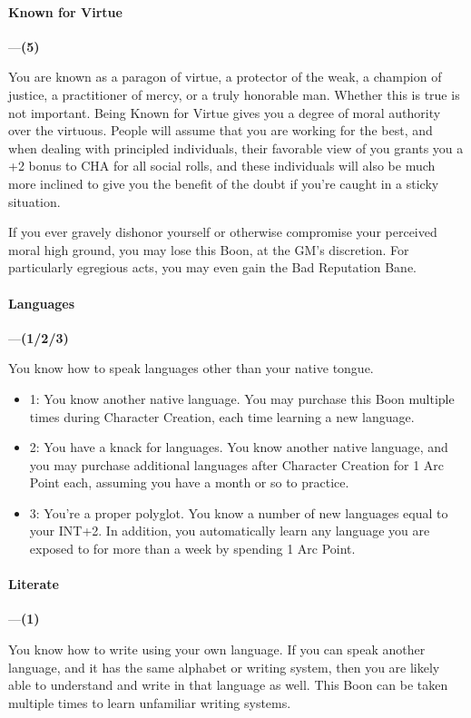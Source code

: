 \documentclass[oneside,11pt,english]{book}
\begin{document}
\paragraph{\label{boon:Known for Virtue}Known for Virtue}---\quad\textbf{(5)}\par
You are known as a paragon of virtue, a protector of the weak, a champion of justice, a practitioner of 
mercy, or a truly honorable man. Whether this is true is not important. Being Known for Virtue gives you 
a degree of moral authority over the virtuous. People will assume that you are working for the best, and 
when dealing with principled individuals, their favorable view of you grants you a +2 bonus to CHA for 
all social rolls, and these individuals will also be much more inclined to give you the benefit of the doubt 
if you're caught in a sticky situation. 


If you ever gravely dishonor yourself or otherwise compromise your perceived moral high ground, you 
may lose this Boon, at the GM's discretion. For particularly egregious acts, you may even gain the Bad 
Reputation Bane. 



\paragraph{\label{boon:Languages}Languages}---\quad\textbf{(1/2/3) }\par
You know how to speak languages other than your native tongue. 
\begin{itemize}
\item 1: You know another native language. You may purchase this Boon multiple times during Character 
Creation, each time learning a new language. 
\item 2: You have a knack for languages. You know another native language, and you may purchase additional 
languages after Character Creation for 1 Arc Point each, assuming you have a month or so to practice. 
\item 3: You're a proper polyglot. You know a number of new languages equal to your INT+2. In addition, you 
automatically learn any language you are exposed to for more than a week by spending 1 Arc Point. 
\end{itemize}
\paragraph{\label{boon:Literate}Literate}---\quad\textbf{(1) }\par
You know how to write using your own language. If you can speak another language, and it has the same 
alphabet or writing system, then you are likely able to understand and write in that language as well. This 
Boon can be taken multiple times to learn unfamiliar writing systems. 
\end{document}

